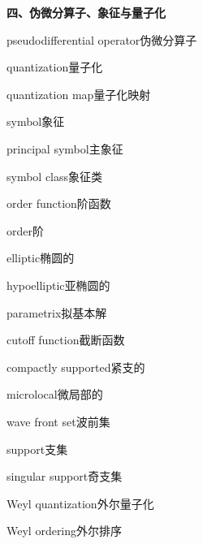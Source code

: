 \filbreak
\vspace{0.9em}
\noindent\textbf{四、伪微分算子、象征与量子化}\par\nobreak\vspace{0.35em}
\begin{multicols}{2}
\raggedright
\setlength{\parindent}{0pt}
\setlength{\parskip}{0.16em}
\linespread{1.02}\selectfont
pseudodifferential operator\hspace{0.9em}伪微分算子\par
quantization\hspace{0.9em}量子化\par
quantization map\hspace{0.9em}量子化映射\par
symbol\hspace{0.9em}象征\par
principal symbol\hspace{0.9em}主象征\par
symbol class\hspace{0.9em}象征类\par
order function\hspace{0.9em}阶函数\par
order\hspace{0.9em}阶\par
elliptic\hspace{0.9em}椭圆的\par
hypoelliptic\hspace{0.9em}亚椭圆的\par
parametrix\hspace{0.9em}拟基本解\par
cutoff function\hspace{0.9em}截断函数\par
compactly supported\hspace{0.9em}紧支的\par
microlocal\hspace{0.9em}微局部的\par
wave front set\hspace{0.9em}波前集\par
support\hspace{0.9em}支集\par
singular support\hspace{0.9em}奇支集\par
Weyl quantization\hspace{0.9em}外尔量子化\par
Weyl ordering\hspace{0.9em}外尔排序\par

\end{multicols}
